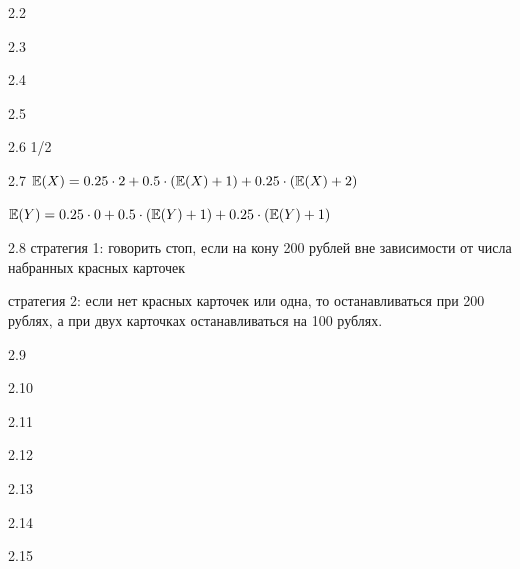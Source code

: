 \protect \hypertarget {soln:2.2}{}
\begin{solution}{{2.2}}
\end{solution}
\protect \hypertarget {soln:2.3}{}
\begin{solution}{{2.3}}
\end{solution}
\protect \hypertarget {soln:2.4}{}
\begin{solution}{{2.4}}
\end{solution}
\protect \hypertarget {soln:2.5}{}
\begin{solution}{{2.5}}
\end{solution}
\protect \hypertarget {soln:2.6}{}
\begin{solution}{{2.6}}
  1/2
\end{solution}
\protect \hypertarget {soln:2.7}{}
\begin{solution}{{2.7}}
  $\mathbb{E}(X)=0.25\cdot 2 + 0.5\cdot (\mathbb{E}(X)+1)+0.25\cdot (\mathbb{E}(X)+2)$

  $\mathbb{E}(Y)=0.25\cdot 0 + 0.5\cdot (\mathbb{E}(Y)+1)+0.25\cdot (\mathbb{E}(Y)+1)$
\end{solution}
\protect \hypertarget {soln:2.8}{}
\begin{solution}{{2.8}}
стратегия 1: говорить стоп, если на кону 200 рублей вне зависимости от числа набранных красных карточек

 стратегия 2: если нет красных карточек или одна, то останавливаться при 200 рублях, а при двух карточках останавливаться на 100 рублях.
\end{solution}
\protect \hypertarget {soln:2.9}{}
\begin{solution}{{2.9}}
\end{solution}
\protect \hypertarget {soln:2.10}{}
\begin{solution}{{2.10}}
\end{solution}
\protect \hypertarget {soln:2.11}{}
\begin{solution}{{2.11}}
\end{solution}
\protect \hypertarget {soln:2.12}{}
\begin{solution}{{2.12}}
\end{solution}
\protect \hypertarget {soln:2.13}{}
\begin{solution}{{2.13}}
\end{solution}
\protect \hypertarget {soln:2.14}{}
\begin{solution}{{2.14}}
\end{solution}
\protect \hypertarget {soln:2.15}{}
\begin{solution}{{2.15}}
\end{solution}
